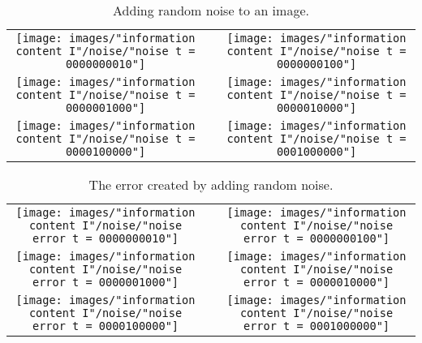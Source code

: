 \begin{table}[htdp]
\caption[Adding random noise to an image]{Adding random noise to an image.}
\begin{center}
\begin{tabular}{ccc}
%
 \texttt{[image: images/"information content I"/noise/"noise t = 0000000010"]} & \phantom{m} &
 \texttt{[image: images/"information content I"/noise/"noise t = 0000000100"]} \\ 
%
 \texttt{[image: images/"information content I"/noise/"noise t = 0000001000"]} & \phantom{m} &
 \texttt{[image: images/"information content I"/noise/"noise t = 0000010000"]} \\
%
 \texttt{[image: images/"information content I"/noise/"noise t = 0000100000"]} & \phantom{m} &
 \texttt{[image: images/"information content I"/noise/"noise t = 0001000000"]} 
%
\end{tabular}
\end{center}
\label{tab:noise:images}
\end{table}%

\begin{table}[htdp]
\caption[The error created by adding random noise]{The error created by adding random noise.}
\begin{center}
\begin{tabular}{ccc}
%
 \texttt{[image: images/"information content I"/noise/"noise error t = 0000000010"]} & \phantom{m} &
 \texttt{[image: images/"information content I"/noise/"noise error t = 0000000100"]} \\ 
%
 \texttt{[image: images/"information content I"/noise/"noise error t = 0000001000"]} & \phantom{m} &
 \texttt{[image: images/"information content I"/noise/"noise error t = 0000010000"]} \\
%
 \texttt{[image: images/"information content I"/noise/"noise error t = 0000100000"]} & \phantom{m} &
 \texttt{[image: images/"information content I"/noise/"noise error t = 0001000000"]} 
%
\end{tabular}
\end{center}
\label{tab:noise:error}
\end{table}%

\endinput